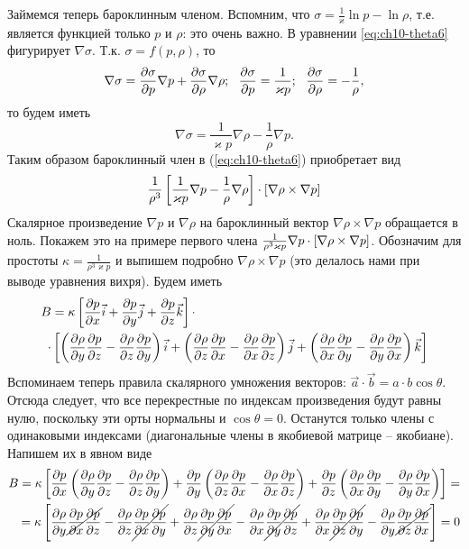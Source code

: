 Займемся теперь бароклинным членом. Вспомним, что $\sigma=\frac{1}{\varkappa}\ln{p}-\ln{\rho}$, т.е. является функцией только $p$ и $\rho$: это очень важно. В уравнении \ref{eq:ch10-theta6} фигурирует $\nabla\sigma$. Т.к. $\sigma=f(p,\rho)$, то
\begin{equation}
    \label{eq:ch10-theta7}
    \nabla\sigma=\pd{\sigma}{p}\nabla p + \pd{\sigma}{\rho}\nabla \rho; \:\:\: \pd{\sigma}{p}=\frac{1}{\varkappa p}; \:\:\: \pd{\sigma}{\rho}=-\frac{1}{\rho},
\end{equation}
то будем иметь
\begin{equation}
    \label{eq:ch10-theta8}
    \nabla\sigma=\frac{1}{\varkappa p}\nabla\rho - \frac{1}{\rho}\nabla p.
\end{equation}
Таким образом бароклинный член в (\ref{eq:ch10-theta6}) приобретает вид
\begin{equation*}
    \frac{1}{\rho^3} \qb{ \frac{1}{\varkappa p}\nabla p - \frac{1}{\rho}\nabla\rho} \cdot \qb{ \nabla\rho \times \nabla p }
\end{equation*}
Скалярное произведение $\nabla p$ и $\nabla\rho$ на бароклинный вектор $\nabla\rho\times\nabla p$ обращается в ноль. Покажем это на примере первого члена $\frac{1}{\rho^3\varkappa p} \nabla p \cdot \qb{\nabla\rho\times\nabla p}$. Обозначим для простоты $\kappa=\frac{1}{\rho^3\varkappa p}$  и выпишем подробно $\nabla\rho\times\nabla p$ (это делалось нами при выводе уравнения вихря). Будем иметь
\begin{align*}
    B &= \kappa \qb{ \pd{p}{x}\vec{i} + \pd{p}{y}\vec{j} + \pd{p}{z}\vec{k} } \cdot \\
    \cdot &\qb{ 
        \rb{ \pd{\rho}{y}\pd{p}{z} - \pd{\rho}{z}\pd{p}{y}}\vec{i} + 
        \rb{ \pd{\rho}{z}\pd{p}{x} - \pd{\rho}{x}\pd{p}{z}}\vec{j} + 
        \rb{ \pd{\rho}{x}\pd{p}{y} - \pd{\rho}{y}\pd{p}{x}}\vec{k}
    }
\end{align*}
Вспоминаем теперь правила скалярного умножения векторов: $\vec{a}\cdot\vec{b}=a\cdot b \cos{\theta}$. Отсюда следует, что все перекрестные по индексам произведения будут равны нулю, поскольку эти орты нормальны и $\cos{\theta}=0$. Останутся только члены с одинаковыми индексами (диагональные члены в якобиевой матрице -- якобиане). Напишем их в явном виде
\begin{align*}
    B = \kappa \qb{ 
        \pd{p}{x}  \rb{ \pd{\rho}{y}\pd{p}{z}-\pd{\rho}{z}\pd{p}{y} } +
        \pd{p}{y}  \rb{ \pd{\rho}{z}\pd{p}{x}-\pd{\rho}{x}\pd{p}{z} } +
        \pd{p}{z}  \rb{ \pd{\rho}{x}\pd{p}{y}-\pd{\rho}{y}\pd{p}{x} } 
    } = \\
      = \kappa \qb{ 
        \pd{\rho}{y}\cancel{\pd{p}{x}\pd{p}{z}}-\pd{\rho}{z}\cancel{\pd{p}{x}\pd{p}{y}}  +
        \pd{\rho}{z}\cancel{\pd{p}{y}\pd{p}{x}}-\pd{\rho}{x}\cancel{\pd{p}{y}\pd{p}{z}}  +
        \pd{\rho}{x}\cancel{\pd{p}{z}\pd{p}{y}}-\pd{\rho}{y}\cancel{\pd{p}{z}\pd{p}{x}}  
    } = 0
\end{align*}

